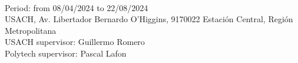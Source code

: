 \begin{titlepage}
\begin{center}
	\@author \\
	\vspace*{0.4cm}

	Period: from 08/04/2024 to 22/08/2024 \\
	\vspace*{0.4cm}
	USACH,  Av. Libertador Bernardo O'Higgins, 9170022 Estación Central, Región Metropolitana \\
	\vspace*{0.4cm}
	USACH supervisor: Guillermo Romero \\
	\vspace*{0.4cm}
	Polytech supervisor:  Pascal Lafon 

\end{center}
	
	
	\vspace{2cm}
	







	
	
	
	
	
	
	
	
	
	
	\vfill 
	
\end{titlepage}


